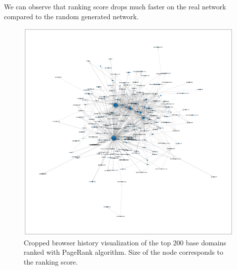 \documentclass[11pt,a4paper]{article}
\begin{document}
We can observe that ranking score drops much faster on the real network compared to the random generated network.

\begin{figure}[h]
\caption{Cropped browser history visualization of the top 200 base domains ranked with PageRank algorithm. Size of the node corresponds to the ranking score.}
\includegraphics[width=0.75\paperwidth,trim={10cm 10cm 10cm 10cm},clip]{imgs/part3.png}
\centering
\end{figure}

% 
% 
\end{document}
